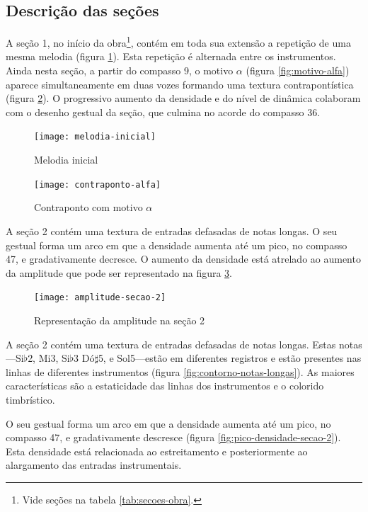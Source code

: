 \subsection{Descrição das seções}
\label{sec:descricao-das-secoes}

A seção 1, no início da obra\footnote{Vide seções na tabela
  \ref{tab:secoes-obra}.}, contém em toda sua extensão a repetição de
uma mesma melodia (figura \ref{fig:melodia-inicial}). Esta repetição é
alternada entre os instrumentos. Ainda nesta seção, a partir do
compasso 9, o motivo $\alpha$ (figura \ref{fig:motivo-alfa}) aparece
simultaneamente em duas vozes formando uma textura contrapontística
(figura \ref{fig:contraponto-alfa}). O progressivo aumento da
densidade e do nível de dinâmica colaboram com o desenho gestual da
seção, que culmina no acorde do compasso 36.

\begin{figure}
  \centering
  \texttt{[image: melodia-inicial]}
  \caption{Melodia inicial}
  \label{fig:melodia-inicial}
\end{figure}

\begin{figure}
  \centering
  \texttt{[image: contraponto-alfa]}
  \caption{Contraponto com motivo $\alpha$}
  \label{fig:contraponto-alfa}
\end{figure}

A seção 2 contém uma textura de entradas defasadas de notas longas. O
seu gestual forma um arco em que a densidade aumenta até um pico, no
compasso 47, e gradativamente decresce. O aumento da densidade está
atrelado ao aumento da amplitude que pode ser representado na figura
\ref{fig:amplitude-secao-2}.

\begin{figure}
  \centering
  \texttt{[image: amplitude-secao-2]}
  \caption{Representação da amplitude na seção 2}
  \label{fig:amplitude-secao-2}
\end{figure}

A seção 2 contém uma textura de entradas defasadas de notas
longas. Estas notas---Si$\flat$2, Mi3, Si$\flat$3 Dó$\sharp$5, e
Sol5---estão em diferentes registros e estão presentes nas linhas de
diferentes instrumentos (figura \ref{fig:contorno-notas-longas}). As
maiores características são a estaticidade das linhas dos instrumentos
e o colorido timbrístico.

O seu gestual forma um arco em que a densidade aumenta até um pico, no
compasso 47, e gradativamente descresce (figura
\ref{fig:pico-densidade-secao-2}). Esta densidade está relacionada ao
estreitamento e posteriormente ao alargamento das entradas
instrumentais.

